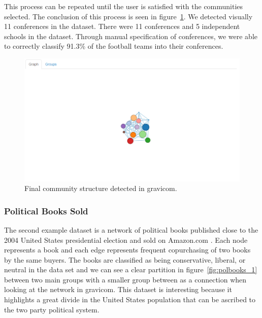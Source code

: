 \documentclass{article}\usepackage[]{graphicx}\usepackage[]{color}
\begin{document}
This process can be repeated until the user is satisfied with the communities selected. The conclusion of this process is seen in figure~\ref{fig:football_8}. We detected visually 11 conferences in the dataset. There were 11 conferences and 5 independent schools in the dataset. Through manual specification of conferences, we were able to correctly classify 91.3\% of the football teams into their conferences.

\begin{figure}[H]
\centering
\includegraphics[width=\textwidth]{images/football_8.png}
\caption{\label{fig:football_8} Final community structure detected in gravicom.}
\end{figure}

\subsubsection{Political Books Sold}
The second example dataset is a network of political books published close to the 2004 United States presidential election and sold on Amazon.com \cite{polbooks}. Each node represents a book and each edge represents frequent copurchasing of two books by the same buyers. The books are classified as being conservative, liberal, or neutral in the data set and we can see a clear partition in figure~\ref{fig:polbooks_1} between two main groups with a smaller group between as a connection when looking at the network in gravicom. This dataset is interesting because it highlights a great divide in the United States population that can be ascribed to the two party political system. 
\end{document}
